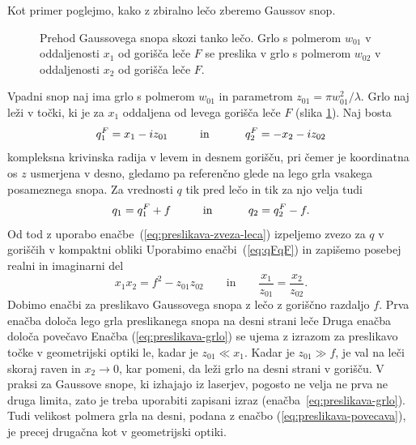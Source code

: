 Kot primer poglejmo, kako z zbiralno lečo zberemo Gaussov snop.
\begin{figure}[h]
\centering
\def\svgwidth{140truemm} 

\caption{Prehod Gaussovega snopa skozi
tanko lečo. Grlo s polmerom $w_{01}$ v oddaljenosti $x_{1}$ od gorišča
leče $F$ se preslika v grlo s polmerom $w_{02}$ v oddaljenosti $x_{2}$ od gorišča
leče $F$.}
\label{fig:Prehod-Gaussovega-snopa}
\end{figure}

Vpadni snop naj ima grlo s polmerom $w_{01}$ in parametrom $z_{01}=\pi w_{01}^2/\lambda$. 
Grlo naj leži v točki, ki je za $x_{1}$ oddaljena od levega gorišča leče $F$ (slika
\ref{fig:Prehod-Gaussovega-snopa}). Naj bosta 
\begin{equation}
q_{1}^{F}=x_{1}-iz_{01}\mbox{\hskip1cm in \hskip1cm}q_{2}^{F}=-x_{2}-iz_{02}
\label{eq:qFqF}
\end{equation}
 kompleksna krivinska radija v levem in desnem gorišču, pri čemer je koordinatna os $z$ 
 usmerjena v desno, gledamo pa referenčno glede na lego grla vsakega posameznega snopa. 
 Za vrednosti $q$ tik pred lečo in tik za njo velja tudi
\begin{equation}
q_{1}=q_{1}^{F}+f\mbox{\hskip1cm in \hskip1cm}q_{2}=q_{2}^{F}-f.
\end{equation}
 Od tod z uporabo enačbe~(\ref{eq:preslikava-zveza-leca}) izpeljemo zvezo
za $q$ v goriščih v kompaktni obliki 
Uporabimo enačbi~(\ref{eq:qFqF}) in 
zapišemo posebej realni in imaginarni del 
\begin{equation}
x_{1}x_{2}=f^{2}-z_{01}z_{02} \qquad \mathrm{in} \qquad
\frac{x_{1}}{z_{01}}=\frac{x_{2}}{z_{02}}.
\end{equation}
Dobimo enačbi za preslikavo Gaussovega snopa z lečo z goriščno razdaljo $f$.
Prva enačba določa lego grla preslikanega snopa na desni strani leče
Druga enačba določa povečavo
Enačba (\ref{eq:preslikava-grlo}) se ujema z izrazom za preslikavo točke v geometrijski
optiki le, kadar je $z_{01}\ll x_{1}$. Kadar je $z_{01}\gg f$, je
val na leči skoraj raven in $x_2 \to 0$, kar pomeni, da leži
grlo na desni strani v gorišču. V praksi za Gaussove snope, ki izhajajo iz laserjev, pogosto ne
velja ne prva ne druga limita, zato je treba uporabiti zapisani izraz 
(enačba~\ref{eq:preslikava-grlo}).
Tudi velikost polmera grla na desni, podana z enačbo (\ref{eq:preslikava-povecava}),
je precej drugačna kot v geometrijski optiki.

